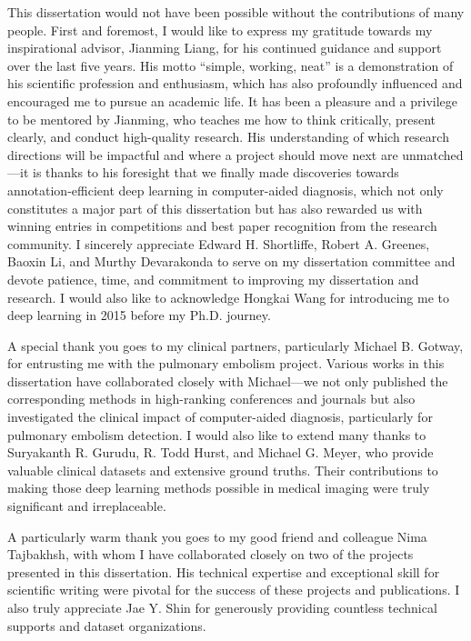 \begin{acknowledgements}

This dissertation would not have been possible without the contributions of many people. First and foremost, I would like to express my gratitude towards my inspirational advisor, Jianming Liang, for his continued guidance and support over the last five years. His motto ``simple, working, neat'' is a demonstration of his scientific profession and enthusiasm, which has also profoundly influenced and encouraged me to pursue an academic life. It has been a pleasure and a privilege to be mentored by Jianming, who teaches me how to think critically, present clearly, and conduct high-quality research. His understanding of which research directions will be impactful and where a project should move next are unmatched---it is thanks to his foresight that we finally made discoveries towards annotation-efficient deep learning in computer-aided diagnosis, which not only constitutes a major part of this dissertation but has also rewarded us with winning entries in competitions and best paper recognition from the research community. I sincerely appreciate Edward H. Shortliffe, Robert A. Greenes, Baoxin Li, and Murthy Devarakonda to serve on my dissertation committee and devote patience, time, and commitment to improving my dissertation and research. I would also like to acknowledge Hongkai Wang for introducing me to deep learning in 2015 before my Ph.D. journey.

A special thank you goes to my clinical partners, particularly Michael B. Gotway, for entrusting me with the pulmonary embolism project. Various works in this dissertation have collaborated closely with Michael---we not only published the corresponding methods in high-ranking conferences and journals but also investigated the clinical impact of computer-aided diagnosis, particularly for pulmonary embolism detection. I would also like to extend many thanks to Suryakanth R. Gurudu, R. Todd Hurst, and Michael G. Meyer, who provide valuable clinical datasets and extensive ground truths. Their contributions to making those deep learning methods possible in medical imaging were truly significant and irreplaceable.

A particularly warm thank you goes to my good friend and colleague Nima Tajbakhsh, with whom I have collaborated closely on two of the projects presented in this dissertation. His technical expertise and exceptional skill for scientific writing were pivotal for the success of these projects and publications. I also truly appreciate Jae Y. Shin for generously providing countless technical supports and dataset organizations. 


\end{acknowledgements}
